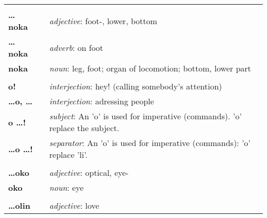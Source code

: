 \begin{supertabular}{p{2,5cm}|ll}
                                 &  &                                                                                                            \\ %
    \textbf{\dots noka}          &  & \textit{adjective}: foot-, lower, bottom                                                                   \\
    \textbf{ \dots noka }        &  & \textit{adverb}: on foot                                                                                   \\
    \textbf{noka}                &  & \textit{noun}: leg, foot; organ of locomotion; bottom, lower part                                          \\
                                 &  &                                                                                                            \\ %
    \textbf{o!}                  &  & \textit{interjection}: hey! (calling somebody's attention)                                                 \\
    \textbf{\dots o, \dots}      &  & \textit{interjection}: adressing people                                                                    \\
    \textbf{o \dots !}           &  & \textit{subject}: An 'o' is used for imperative (commands). 'o' replace the subject.                       \\
    \textbf{\dots o \dots !}     &  & \textit{separator}: An 'o' is used for imperative (commands): 'o' replace 'li'.                            \\
                                 &  &                                                                                                            \\ %
    \textbf{\dots oko}           &  & \textit{adjective}: optical, eye-                                                                          \\
    \textbf{oko}                 &  & \textit{noun}: eye                                                                                         \\
                                 &  &                                                                                                            \\ %
    \textbf{\dots olin}          &  & \textit{adjective}: love                                                                                   \\

\end{supertabular}
